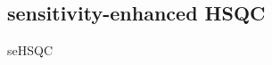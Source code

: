 \subsection{\texorpdfstring{\carbon{}}{13C} sensitivity-enhanced HSQC}
\label{subsec:noah__sehsqc_c}

\carbon{} seHSQC

